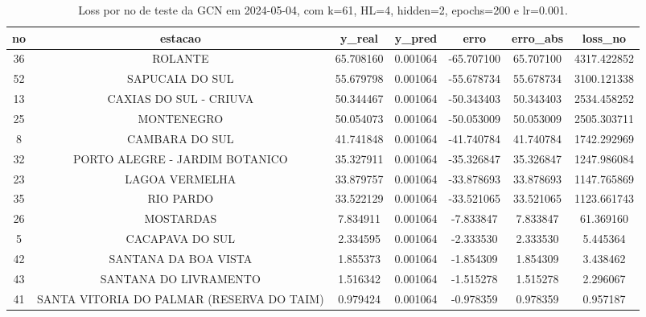 \begin{table}[h]
\centering
\caption{Loss por no de teste da GCN em 2024-05-04, com k=61, HL=4, hidden=2, epochs=200 e lr=0.001.}
\label{tab:gcn_loss_k61_hl4_h2_e200_d20240504}
\begin{tabular}{ccccccc}
\toprule
no & estacao & y\_real & y\_pred & erro & erro\_abs & loss\_no \\
\midrule
36 & ROLANTE & 65.708160 & 0.001064 & -65.707100 & 65.707100 & 4317.422852 \\
52 & SAPUCAIA DO SUL & 55.679798 & 0.001064 & -55.678734 & 55.678734 & 3100.121338 \\
13 & CAXIAS DO SUL - CRIUVA & 50.344467 & 0.001064 & -50.343403 & 50.343403 & 2534.458252 \\
25 & MONTENEGRO & 50.054073 & 0.001064 & -50.053009 & 50.053009 & 2505.303711 \\
8 & CAMBARA DO SUL & 41.741848 & 0.001064 & -41.740784 & 41.740784 & 1742.292969 \\
32 & PORTO ALEGRE - JARDIM BOTANICO & 35.327911 & 0.001064 & -35.326847 & 35.326847 & 1247.986084 \\
23 & LAGOA VERMELHA & 33.879757 & 0.001064 & -33.878693 & 33.878693 & 1147.765869 \\
35 & RIO PARDO & 33.522129 & 0.001064 & -33.521065 & 33.521065 & 1123.661743 \\
26 & MOSTARDAS & 7.834911 & 0.001064 & -7.833847 & 7.833847 & 61.369160 \\
5 & CACAPAVA DO SUL & 2.334595 & 0.001064 & -2.333530 & 2.333530 & 5.445364 \\
42 & SANTANA DA BOA VISTA & 1.855373 & 0.001064 & -1.854309 & 1.854309 & 3.438462 \\
43 & SANTANA DO LIVRAMENTO & 1.516342 & 0.001064 & -1.515278 & 1.515278 & 2.296067 \\
41 & SANTA VITORIA DO PALMAR (RESERVA DO TAIM) & 0.979424 & 0.001064 & -0.978359 & 0.978359 & 0.957187 \\
\bottomrule
\end{tabular}
\end{table}
